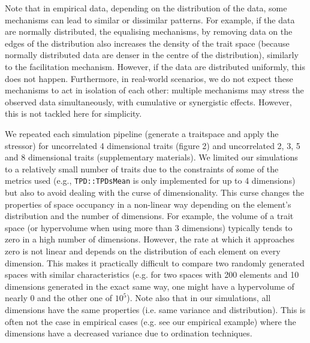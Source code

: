 \documentclass[12pt,letterpaper]{article}
\begin{document}
Note that in empirical data, depending on the distribution of the data, some mechanisms can lead to similar or dissimilar patterns.
For example, if the data are normally distributed, the equalising mechanisms, by removing data on the edges of the distribution also increases the density of the trait space (because normally distributed data are denser in the centre of the distribution), similarly to the facilitation mechanism.
However, if the data are distributed uniformly, this does not happen.
Furthermore, in real-world scenarios, we do not expect these mechanisms to act in isolation of each other: multiple mechanisms may stress the observed data simultaneously, with cumulative or synergistic effects.
However, this is not tackled here for simplicity.

We repeated each simulation pipeline (generate a traitspace and apply the stressor) for uncorrelated 4 dimensional traits (figure 2) and uncorrelated 2, 3, 5 and 8 dimensional traits (supplementary materials).
We limited our simulations to a relatively small number of traits due to the constraints of some of the metrics used (e.g., \texttt{TPD::TPDsMean} is only implemented for up to 4 dimensions) but also to avoid dealing with the curse of dimensionality.
This curse changes the properties of space occupancy in a non-linear way depending on the element's distribution and the number of dimensions.
For example, the volume of a trait space (or hypervolume when using more than 3 dimensions) typically tends to zero in a high number of dimensions.
However, the rate at which it approaches zero is not linear and depends on the distribution of each element on every dimension.
This makes it practically difficult to compare two randomly generated spaces with similar characteristics (e.g. for two spaces with 200 elements and 10 dimensions generated in the exact same way, one might have a hypervolume of nearly 0 and the other one of $10^5$).
Note also that in our simulations, all dimensions have the same properties (i.e.
same variance and distribution).
This is often not the case in empirical cases (e.g. see our empirical example) where the dimensions have a decreased variance due to ordination techniques.
 
\end{document}
